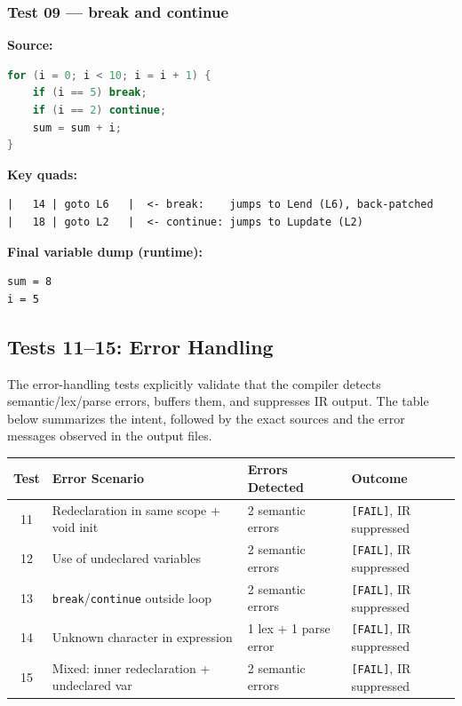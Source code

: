 \documentclass[11pt]{article}
\begin{document}
\subsubsection{Test 09 --- break and continue}

\textbf{Source:}
\begin{lstlisting}[style=cstyle, language=C]
for (i = 0; i < 10; i = i + 1) {
    if (i == 5) break;
    if (i == 2) continue;
    sum = sum + i;
}
\end{lstlisting}

\textbf{Key quads:}
\begin{lstlisting}[style=outputstyle]
|   14 | goto L6   |  <- break:    jumps to Lend (L6), back-patched
|   18 | goto L2   |  <- continue: jumps to Lupdate (L2)
\end{lstlisting}

\textbf{Final variable dump (runtime):}
\begin{lstlisting}[style=outputstyle]
sum = 8
i = 5
\end{lstlisting}

\subsection{Tests 11--15: Error Handling}

The error-handling tests explicitly validate that the compiler detects semantic/lex/parse errors, buffers them, and suppresses IR output. The table below summarizes the intent, followed by the exact sources and the error messages observed in the output files.

\begin{center}
\renewcommand{\arraystretch}{1.3}
\begin{tabular}{@{}clll@{}}
\toprule
\textbf{Test} & \textbf{Error Scenario} & \textbf{Errors Detected} & \textbf{Outcome} \\
\midrule
11 & Redeclaration in same scope + void init & 2 semantic errors & \texttt{[FAIL]}, IR suppressed \\
12 & Use of undeclared variables & 2 semantic errors & \texttt{[FAIL]}, IR suppressed \\
13 & \texttt{break}/\texttt{continue} outside loop & 2 semantic errors & \texttt{[FAIL]}, IR suppressed \\
14 & Unknown character in expression & 1 lex + 1 parse error & \texttt{[FAIL]}, IR suppressed \\
15 & Mixed: inner redeclaration + undeclared var & 2 semantic errors & \texttt{[FAIL]}, IR suppressed \\
\bottomrule
\end{tabular}
\end{center}
\end{document}
